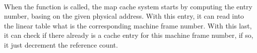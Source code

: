 \paragraph{}
When the \unmap function is called, the map cache system starts by computing
the entry number, basing on the given physical address.
With this entry, it can read into the linear table what is the corresponding
machine frame number.
With this last, it can check if there already is a cache entry for this machine
frame number, if so, it just decrement the reference count.
